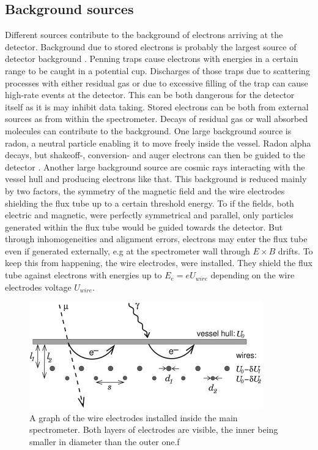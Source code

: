       \subsection{Background sources}
      \label{ch:The KATRIN experiment:sec:Experimental setup:subsec:BackgroundSources}
      Different sources contribute to the background of electrons arriving at the detector. Background due to stored electrons is probably the largest source of detector background \cite{storedElectrons}. Penning traps cause electrons with energies in a certain range to be caught in a potential cup. Discharges of those traps due to scattering processes with either residual gas or due to excessive filling of the trap can cause high-rate events at the detector. This can be both dangerous for the detector itself as it is may inhibit data taking. Stored electrons can be both from external sources as from within the spectrometer. Decays of residual gas or wall absorbed molecules can contribute to the background. One large background source is radon, a neutral particle enabling it to move freely inside the vessel. Radon alpha decays, but shakeoff-, conversion- and auger electrons can then be guided to the detector \cite{radonGoerhard, radonWandkowsky}.
      Another large background source are cosmic rays interacting with the vessel hull and producing electrons like that. This background is reduced mainly by two factors, the symmetry of the magnetic field and the wire electrodes shielding the flux tube up to a certain threshold energy.
      To if the fields, both electric and magnetic, were perfectly symmetrical and parallel, only particles generated within the flux tube would be guided towards the detector. But through inhomogeneities and alignment errors, electrons may enter the flux tube even if generated externally, e.g at the spectrometer wall through $E\times B$ drifts. To keep this from happening, the wire electrodes, were installed. They shield the flux tube against electrons with energies up to $E_e = eU_{wire}$ depending on the wire electrodes voltage $U_{wire}$. 
      \begin{figure}
		\centering
		\includegraphics{graphics/katrinExperiment/wireElectrodes.jpg}
		\caption[Wire electrodes]{A graph of the wire electrodes installed inside the main spectrometer. Both layers of electrodes are visible, the inner being smaller in diameter than the outer one.f}
	  \end{figure}